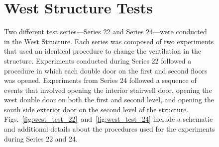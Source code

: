 \documentclass[12pt,oneside]{book}
\begin{document}
\begin{figure}[!ht]
\begin{minipage}[b]{0.8\columnwidth}
\begin{flushleft}
\section{West Structure Tests}
\label{sec:west_procedure}
Two different test series---Series 22 and Series 24---were conducted in the West Structure. Each series was composed of two experiments that used an identical procedure to change the ventilation in the structure. Experiments conducted during Series 22 followed a procedure in which each double door on the first and second floors was opened. Experiments from Series 24 followed a sequence of events that involved opening the interior stairwell door, opening the west double door on both the first and second level, and opening the south side exterior door on the second level of the structure. Figs.~\ref{fig:west_test_22}~and~\ref{fig:west_test_24} include a schematic and additional details about the procedures used for the experiments during Series 22 and 24.


\end{flushleft}
\end{minipage}
\end{figure}
\end{document}
